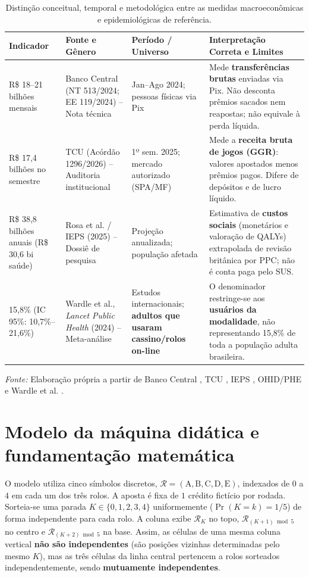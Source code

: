 \documentclass[10pt,a4paper]{article}
\begin{document}
\begin{table}[H]
\centering
\caption{Distinção conceitual, temporal e metodológica entre as medidas macroeconômicas e epidemiológicas de referência.}
\label{tab:contexto}
\footnotesize
\begin{tabular}{p{2.8cm}p{3.6cm}p{3.0cm}p{6.8cm}}
\toprule
\textbf{Indicador} & \textbf{Fonte e Gênero} & \textbf{Período / Universo} & \textbf{Interpretação Correta e Limites} \\
\midrule
R\$ 18--21 bilhões mensais & Banco Central (NT 513/2024; EE 119/2024) \cite{bcb2024} -- Nota técnica & Jan--Ago 2024; pessoas físicas via Pix & Mede \textbf{transferências brutas} enviadas via Pix. Não desconta prêmios sacados nem reapostas; não equivale à perda líquida. \\
R\$ 17,4 bilhões no semestre & TCU (Acórdão 1296/2026) \cite{tcu2026} -- Auditoria institucional & 1º sem. 2025; mercado autorizado (SPA/MF) & Mede a \textbf{receita bruta de jogos (GGR)}: valores apostados menos prêmios pagos. Difere de depósitos e de lucro líquido. \\
R\$ 38,8 bilhões anuais (R\$ 30,6 bi saúde) & Rosa et al. / IEPS (2025) \cite{ieps2025} -- Dossiê de pesquisa & Projeção anualizada; população afetada & Estimativa de \textbf{custos sociais} (monetários e valoração de QALYs) extrapolada de revisão britânica \cite{ohid2023} por PPC; não é conta paga pelo SUS. \\
15,8\% (IC 95\%: 10,7\%--21,6\%) & Wardle et al., \textit{Lancet Public Health} (2024) \cite{wardle2024} -- Meta-análise & Estudos internacionais; \textbf{adultos que usaram cassino/rolos on-line} & O denominador restringe-se aos \textbf{usuários da modalidade}, não representando 15,8\% de toda a população adulta brasileira. \\
\bottomrule
\end{tabular}
\begin{flushleft}
\scriptsize \textit{Fonte:} Elaboração própria a partir de Banco Central \cite{bcb2024}, TCU \cite{tcu2026}, IEPS \cite{ieps2025}, OHID/PHE \cite{ohid2023} e Wardle et al. \cite{wardle2024}.
\end{flushleft}
\end{table}

\section{Modelo da máquina didática e fundamentação matemática}

O modelo utiliza cinco símbolos discretos, $\mathcal{R} = (\text{A}, \text{B}, \text{C}, \text{D}, \text{E})$, indexados de $0$ a $4$ em cada um dos três rolos. A aposta é fixa de $1$ crédito fictício por rodada. Sorteia-se uma parada $K \in \{0, 1, 2, 3, 4\}$ uniformemente ($\Pr(K=k) = 1/5$) de forma independente para cada rolo. A coluna exibe $\mathcal{R}_K$ no topo, $\mathcal{R}_{(K+1) \bmod 5}$ no centro e $\mathcal{R}_{(K+2) \bmod 5}$ na base. Assim, as células de uma mesma coluna vertical \textbf{não são independentes} (são posições vizinhas determinadas pelo mesmo $K$), mas as três células da linha central pertencem a rolos sorteados independentemente, sendo \textbf{mutuamente independentes}.
\end{document}
